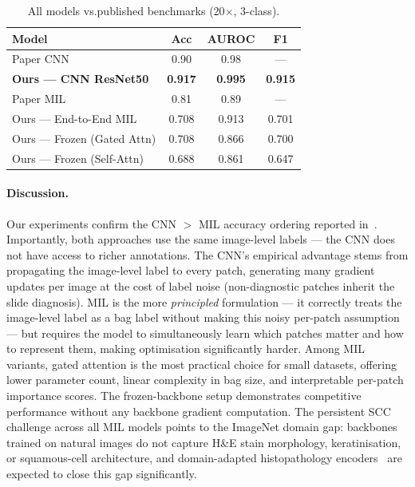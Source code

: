 \documentclass[10pt,twocolumn,letterpaper]{article}
\begin{document}
\begin{table}[h]
\centering
\caption{All models vs.\@ published benchmarks (20$\times$, 3-class).}
\label{tab:all_results}
\setlength{\tabcolsep}{4pt}
\begin{tabular}{lccc}
\toprule
Model & Acc & AUROC & F1 \\
\midrule
Paper CNN~\cite{lunghist700paper}       & 0.90 & 0.98 & --- \\
\textbf{Ours — CNN ResNet50}            & \textbf{0.917} & \textbf{0.995} & \textbf{0.915} \\
\midrule
Paper MIL~\cite{lunghist700paper}       & 0.81 & 0.89 & --- \\
Ours — End-to-End MIL                   & 0.708 & 0.913 & 0.701 \\
Ours — Frozen (Gated Attn)              & 0.708 & 0.866 & 0.700 \\
Ours — Frozen (Self-Attn)              & 0.688 & 0.861 & 0.647 \\
\bottomrule
\end{tabular}
\end{table}

\paragraph{Discussion.}
Our experiments confirm the CNN $>$ MIL accuracy ordering reported in~\cite{lunghist700paper}. Importantly, both approaches use the same image-level labels — the CNN does not have access to richer annotations. The CNN's empirical advantage stems from propagating the image-level label to every patch, generating many gradient updates per image at the cost of label noise (non-diagnostic patches inherit the slide diagnosis). MIL is the more \emph{principled} formulation — it correctly treats the image-level label as a bag label without making this noisy per-patch assumption — but requires the model to simultaneously learn which patches matter and how to represent them, making optimisation significantly harder. Among MIL variants, gated attention is the most practical choice for small datasets, offering lower parameter count, linear complexity in bag size, and interpretable per-patch importance scores. The frozen-backbone setup demonstrates competitive performance without any backbone gradient computation. The persistent SCC challenge across all MIL models points to the ImageNet domain gap: backbones trained on natural images do not capture H\&E stain morphology, keratinisation, or squamous-cell architecture, and domain-adapted histopathology encoders~\cite{chen2022,kather2019} are expected to close this gap significantly.
\end{document}
